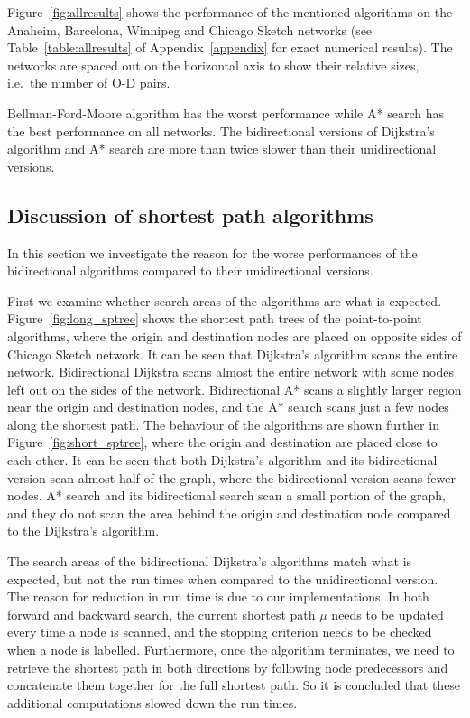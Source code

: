 Figure~\ref{fig:allresults} shows the performance of the mentioned algorithms on the Anaheim, Barcelona, Winnipeg and Chicago Sketch networks
(see Table~\ref{table:allresults} of Appendix~\ref{appendix} for exact numerical results).
The networks are spaced out on the horizontal axis to show their relative sizes, i.e.\ the number of O-D pairs.

Bellman-Ford-Moore algorithm has the worst performance while A* search has the best performance on all networks.
The bidirectional versions of Dijkstra's algorithm and A* search are more than twice slower than their unidirectional versions.

\subsection{Discussion of shortest path algorithms}
In this section we investigate the reason for the worse performances of the bidirectional algorithms compared to their unidirectional versions. 

First we examine whether search areas of the algorithms are what is expected.
Figure~\ref{fig:long_sptree} shows the shortest path trees of the point-to-point algorithms, 
where the origin and destination nodes are placed on opposite sides of Chicago Sketch network.
It can be seen that Dijkstra's algorithm scans the entire network.
Bidirectional Dijkstra scans almost the entire network with some nodes left out on the sides of the network.
Bidirectional A* scans a slightly larger region near the origin and destination nodes,
and the A* search scans just a few nodes along the shortest path.
The behaviour of the algorithms are shown further in Figure~\ref{fig:short_sptree},
where the origin and destination are placed close to each other.
It can be seen that both Dijkstra's algorithm and its bidirectional version scan almost half of the graph,
where the bidirectional version scans fewer nodes.
A* search and its bidirectional search scan a small portion of the graph,
and they do not scan the area behind the origin and destination node compared to the Dijkstra's algorithm.

The search areas of the bidirectional Dijkstra's algorithms match what is expected,
but not the run times when compared to the unidirectional version.
The reason for reduction in run time is due to our implementations.
In both forward and backward search,
the current shortest path $\mu$ needs to be updated every time a node is scanned,
and the stopping criterion needs to be checked when a node is labelled.
Furthermore,
once the algorithm terminates,
we need to retrieve the shortest path in both directions by following node predecessors and concatenate them together for the full shortest path.
So it is concluded that these additional computations slowed down the run times.

